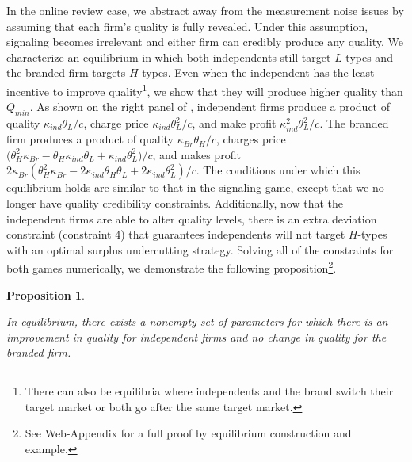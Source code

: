 \documentclass{informs_mod} %
\newtheorem{prop}{Proposition}
\begin{document}
In the online review case, we abstract away from the measurement noise issues by assuming that each firm's quality is fully revealed. Under this assumption, signaling becomes irrelevant and either firm can credibly produce any quality. We characterize an equilibrium in which both independents still target $L$-types and the branded firm targets $H$-types. Even when the independent has the least incentive to improve quality\footnote{There can also be equilibria where independents and the brand switch their target market or both go after the same target market.}, we show that they will produce higher quality than $Q_{min}$. As shown on the right panel of , independent firms produce a product of quality $\kappa_{ind}\theta_L/c$, charge price $\kappa_{ind}\theta_L^2/c$, and make profit $\kappa_{ind}^2\theta_L^2/c$. The branded firm produces a product of quality $\kappa_{Br}\theta_H/c$, charges price $\big(\theta_H^2 \kappa_{Br}-\theta_H \kappa_{ind} \theta_L+\kappa_{ind} \theta_L^2\big)/c$, and makes profit $2 \kappa_{Br} (\theta_H^2 \kappa_{Br}-2 \kappa_{ind} \theta_H \theta_L+2 \kappa_{ind} \theta_L^2)/c$. The conditions under which this equilibrium holds are similar to that in the signaling game, except that we no longer have quality credibility constraints. Additionally, now that the independent firms are able to alter quality levels, there is an extra deviation constraint (constraint 4) that guarantees independents will not target $H$-types with an optimal surplus undercutting strategy. Solving all of the constraints for both games numerically, we demonstrate the following proposition\footnote{See Web-Appendix for a full proof by equilibrium construction and example.}.

\begin{prop}\label{thm:nonempty}
\begin{enumerate}
In equilibrium, there exists a nonempty set of parameters for which there is an improvement in quality for independent firms and no change in quality for the branded firm.
\end{enumerate}
\end{prop}
\end{document}
